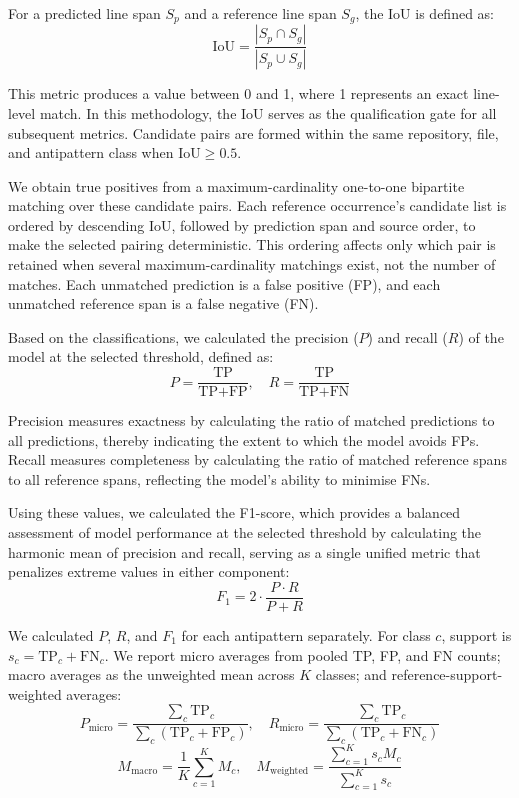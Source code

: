 For a predicted line span \(S_p\) and a reference line span \(S_g\), the IoU is defined as:
\begin{equation}
\text{IoU} = \frac{|S_p \cap S_g|}{|S_p \cup S_g|}
\end{equation}

This metric produces a value between \num{0} and \num{1}, where \num{1} represents an exact line-level match. In this methodology, the IoU serves as the qualification gate for all subsequent metrics. Candidate pairs are formed within the same repository, file, and antipattern class when \(\text{IoU} \geq 0.5\).

We obtain true positives from a maximum-cardinality one-to-one bipartite matching over these candidate pairs. Each reference occurrence's candidate list is ordered by descending IoU, followed by prediction span and source order, to make the selected pairing deterministic. This ordering affects only which pair is retained when several maximum-cardinality matchings exist, not the number of matches. Each unmatched prediction is a false positive (FP), and each unmatched reference span is a false negative (FN).

Based on the classifications, we calculated the precision (\(P\)) and recall (\(R\)) of the model at the selected threshold, defined as:
\begin{equation}
P = \frac{\text{TP}}{\text{TP} + \text{FP}}, \quad R = \frac{\text{TP}}{\text{TP} + \text{FN}}
\end{equation}

Precision measures exactness by calculating the ratio of matched predictions to all predictions, thereby indicating the extent to which the model avoids FPs. Recall measures completeness by calculating the ratio of matched reference spans to all reference spans, reflecting the model's ability to minimise FNs.

Using these values, we calculated the F1-score, which provides a balanced assessment of model performance at the selected threshold by calculating the harmonic mean of precision and recall, serving as a single unified metric that penalizes extreme values in either component:
\begin{equation}
F_1 = 2 \cdot \frac{P \cdot R}{P + R}
\end{equation}

We calculated \(P\), \(R\), and \(F_1\) for each antipattern separately. For class \(c\), support is \(s_c=\text{TP}_c+\text{FN}_c\). We report micro averages from pooled TP, FP, and FN counts; macro averages as the unweighted mean across \(K\) classes; and reference-support-weighted averages:
\begin{equation}
P_{\mathrm{micro}}=\frac{\sum_c \text{TP}_c}{\sum_c(\text{TP}_c+\text{FP}_c)}, \quad
R_{\mathrm{micro}}=\frac{\sum_c \text{TP}_c}{\sum_c(\text{TP}_c+\text{FN}_c)}
\end{equation}
\begin{equation}
M_{\mathrm{macro}}=\frac{1}{K}\sum_{c=1}^{K}M_c, \quad
M_{\mathrm{weighted}}=\frac{\sum_{c=1}^{K}s_cM_c}{\sum_{c=1}^{K}s_c}
\end{equation}

